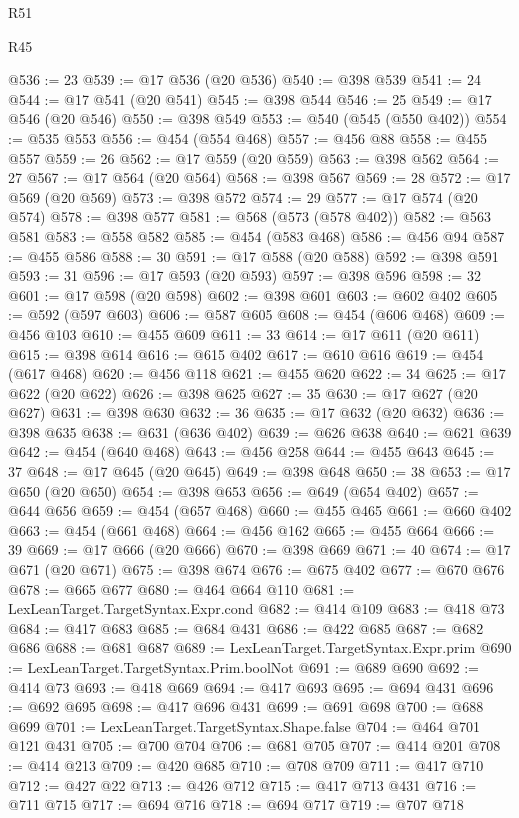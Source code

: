 \begin{lexlean}{R51}
\begin{lexlean}{R45}
\begin{coremodule}
{{{{{{{{{{{{{{{{{{{{{{{{{{{{{{{{{{{{{{{{{{{{{{{{{{{{{{{{{{{{{{{{{{{{{{{{{{{{{{{{{{{{{{{{{{{@536 := 23
@539 := @17 @536 (@20 @536)
@540 := @398 @539
@541 := 24
@544 := @17 @541 (@20 @541)
@545 := @398 @544
@546 := 25
@549 := @17 @546 (@20 @546)
@550 := @398 @549
@553 := @540 (@545 (@550 @402))
@554 := @535 @553
@556 := @454 (@554 @468)
@557 := @456 @88
@558 := @455 @557
@559 := 26
@562 := @17 @559 (@20 @559)
@563 := @398 @562
@564 := 27
@567 := @17 @564 (@20 @564)
@568 := @398 @567
@569 := 28
@572 := @17 @569 (@20 @569)
@573 := @398 @572
@574 := 29
@577 := @17 @574 (@20 @574)
@578 := @398 @577
@581 := @568 (@573 (@578 @402))
@582 := @563 @581
@583 := @558 @582
@585 := @454 (@583 @468)
@586 := @456 @94
@587 := @455 @586
@588 := 30
@591 := @17 @588 (@20 @588)
@592 := @398 @591
@593 := 31
@596 := @17 @593 (@20 @593)
@597 := @398 @596
@598 := 32
@601 := @17 @598 (@20 @598)
@602 := @398 @601
@603 := @602 @402
@605 := @592 (@597 @603)
@606 := @587 @605
@608 := @454 (@606 @468)
@609 := @456 @103
@610 := @455 @609
@611 := 33
@614 := @17 @611 (@20 @611)
@615 := @398 @614
@616 := @615 @402
@617 := @610 @616
@619 := @454 (@617 @468)
@620 := @456 @118
@621 := @455 @620
@622 := 34
@625 := @17 @622 (@20 @622)
@626 := @398 @625
@627 := 35
@630 := @17 @627 (@20 @627)
@631 := @398 @630
@632 := 36
@635 := @17 @632 (@20 @632)
@636 := @398 @635
@638 := @631 (@636 @402)
@639 := @626 @638
@640 := @621 @639
@642 := @454 (@640 @468)
@643 := @456 @258
@644 := @455 @643
@645 := 37
@648 := @17 @645 (@20 @645)
@649 := @398 @648
@650 := 38
@653 := @17 @650 (@20 @650)
@654 := @398 @653
@656 := @649 (@654 @402)
@657 := @644 @656
@659 := @454 (@657 @468)
@660 := @455 @465
@661 := @660 @402
@663 := @454 (@661 @468)
@664 := @456 @162
@665 := @455 @664
@666 := 39
@669 := @17 @666 (@20 @666)
@670 := @398 @669
@671 := 40
@674 := @17 @671 (@20 @671)
@675 := @398 @674
@676 := @675 @402
@677 := @670 @676
@678 := @665 @677
@680 := @464 @664 @110
@681 := LexLeanTarget.TargetSyntax.Expr.cond
@682 := @414 @109
@683 := @418 @73
@684 := @417 @683
@685 := @684 @431
@686 := @422 @685
@687 := @682 @686
@688 := @681 @687
@689 := LexLeanTarget.TargetSyntax.Expr.prim
@690 := LexLeanTarget.TargetSyntax.Prim.boolNot
@691 := @689 @690
@692 := @414 @73
@693 := @418 @669
@694 := @417 @693
@695 := @694 @431
@696 := @692 @695
@698 := @417 @696 @431
@699 := @691 @698
@700 := @688 @699
@701 := LexLeanTarget.TargetSyntax.Shape.false
@704 := @464 @701 @121 @431
@705 := @700 @704
@706 := @681 @705
@707 := @414 @201
@708 := @414 @213
@709 := @420 @685
@710 := @708 @709
@711 := @417 @710
@712 := @427 @22
@713 := @426 @712
@715 := @417 @713 @431
@716 := @711 @715
@717 := @694 @716
@718 := @694 @717
@719 := @707 @718
}}}}}}}}}}}}}}}}}}}}}}}}}}}}}}}}}}}}}}}}}}}}}}}}}}}}}}}}}}}}}}}}}}}}}}}}}}}}}}}}}}}}}}}}}}}
\end{coremodule}
\end{lexlean}
\end{lexlean}
